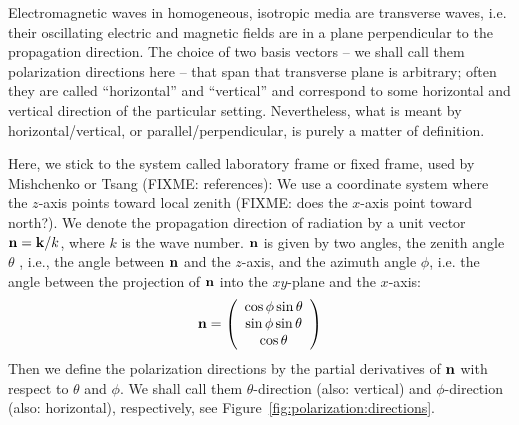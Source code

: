 \label{sec:polarization:directions}
Electromagnetic waves in homogeneous, isotropic media are transverse
waves, i.e. their oscillating electric and magnetic fields are in a
plane perpendicular to the propagation direction. The choice of two
basis vectors -- we shall call them polarization directions here --
that span that transverse plane is arbitrary; often they are called
``horizontal'' and ``vertical'' and correspond to some horizontal and
vertical direction of the particular setting. Nevertheless, what is
meant by horizontal/vertical, or parallel/perpendicular, is purely a
matter of definition.

Here, we stick to the system called laboratory frame or fixed frame,
used by Mishchenko or Tsang (FIXME: references): We use a coordinate
system where the $z$-axis points toward local zenith (FIXME: does the
$x$-axis point toward north?).  We denote the propagation direction of
radiation by a unit vector $\mathbf{n} = \mathbf{k}/k$, where
$k$ is the wave number. $\mathbf{n}$ is given by two
angles, the zenith angle $\theta$ , i.e., the angle between
$\mathbf{n}$ and the $z$-axis, and the azimuth angle $\phi$, i.e. the
angle between the projection of $\mathbf{n}$ into the $xy$-plane and
the $x$-axis:
\begin{equation}
  \label{eq:polarization:propdir}
   \VctStl{n} = \ColVct{\cos\phi \sin\theta}%
                       {\sin\phi \sin\theta}%
                       { \cos\theta}                    
\end{equation}
Then we define the polarization directions by the partial derivatives
of  $\mathbf{n}$ with respect to $\theta$ and $\phi$. We shall call
them $\theta$-direction (also: vertical) and $\phi$-direction (also:
horizontal), respectively, see
Figure~\ref{fig:polarization:directions}. 
